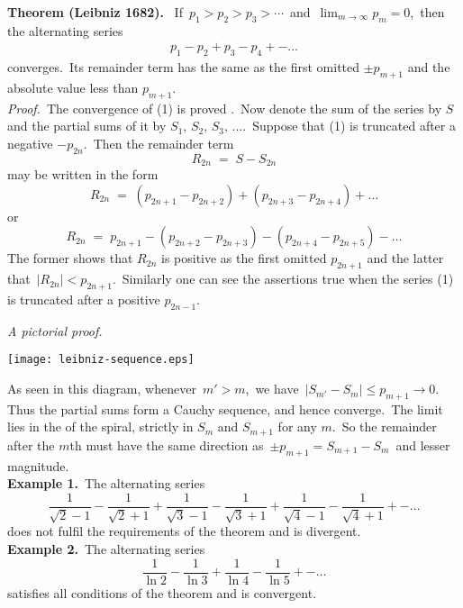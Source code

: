 \documentclass[12pt]{article}
\theoremstyle{definition}
\providecommand{\abs}[1]{\lvert#1\rvert}
\begin{document}
\textbf{Theorem (Leibniz 1682).}
 \, If \,$p_1 > p_2 > p_3 > \cdots$\, and\, $\displaystyle\lim_{m\to\infty}p_m = 0$,\, then the alternating series 
\begin{align}
p_1-p_2+p_3-p_4+-\ldots
\end{align}
converges.\, Its remainder term has the same  as the first omitted  $\pm p_{m+1}$ and the absolute value less than $p_{m+1}$.\\

{\em Proof.}\, The convergence of (1) is proved 
.\, Now denote the sum of the series by $S$ and the partial sums of it by $S_1,\,S_2,\,S_3,\,\ldots$.\, Suppose that (1) is truncated after a negative  $-p_{2n}$.\, Then the remainder term
$$R_{2n} \;=\; S\!-\!S_{2n}$$
may be written in the form
$$R_{2n} \;=\; (p_{2n+1}-p_{2n+2})+(p_{2n+3}-p_{2n+4})+\ldots$$
or
$$R_{2n} \;=\; p_{2n+1}-(p_{2n+2}-p_{2n+3})-(p_{2n+4}-p_{2n+5})-\ldots$$
The former shows that $R_{2n}$ is positive as the first omitted  $p_{2n+1}$ and the latter that\, $|R_{2n}| < p_{2n+1}$.\, Similarly one can see the assertions true when the series (1) is truncated after a positive  $p_{2n-1}$.\\

\bigskip

\emph{A pictorial proof.}

\begin{center}
\texttt{[image: leibniz-sequence.eps]}
\end{center}

As seen in this diagram, whenever\, $m' > m$,\, we have\, 
$\abs{S_{m'}\!-\!S_m} \leq p_{m+1} \to 0$.\, Thus the partial sums form a Cauchy sequence, and hence converge.\, The limit lies in the  of the spiral, strictly in  $S_m$ and $S_{m+1}$ for any $m$.\, So the remainder after the $m$th  must have the same direction as\, $\pm p_{m+1} = S_{m+1}\!-\!S_m$\, and lesser magnitude.\\

\textbf{Example 1.}\, The alternating series
$$\frac{1}{\sqrt{2}-1}-\frac{1}{\sqrt{2}+1}
+\frac{1}{\sqrt{3}-1}-\frac{1}{\sqrt{3}+1}
+\frac{1}{\sqrt{4}-1}-\frac{1}{\sqrt{4}+1}+-\ldots$$
does not fulfil the requirements of the theorem and is divergent.\\

\textbf{Example 2.}\, The alternating series
$$\frac{1}{\ln{2}}-\frac{1}{\ln{3}}+\frac{1}{\ln{4}}-\frac{1}{\ln{5}}+-\ldots$$
satisfies all conditions of the theorem and is convergent.
\end{document}
